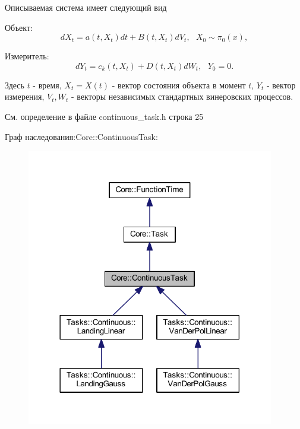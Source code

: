 Описываемая система имеет следующий вид


\begin{DoxyItemize}
\item Объект\+: \[dX_t = a(t, X_t)dt + B(t, X_t)dV_t,\ \ \ X_0 \sim \pi_0(x),\]
\item Измеритель\+: \[dY_t = c_k(t, X_t) + D(t, X_t)dW_t,\ \ \ Y_0 = 0.\]
\end{DoxyItemize}

Здесь $t$ -\/ время, $X_t = X(t)$ -\/ вектор состояния объекта в момент $t$, $Y_t$ -\/ вектор измерения, $V_t, W_t$ -\/ векторы независимых стандартных винеровских процессов. 

См. определение в файле continuous\+\_\+task.\+h строка 25



Граф наследования\+:Core\+:\+:Continuous\+Task\+:
\nopagebreak
\begin{figure}[H]
\begin{center}
\leavevmode
\includegraphics[width=306pt]{class_core_1_1_continuous_task__inherit__graph}
\end{center}
\end{figure}


